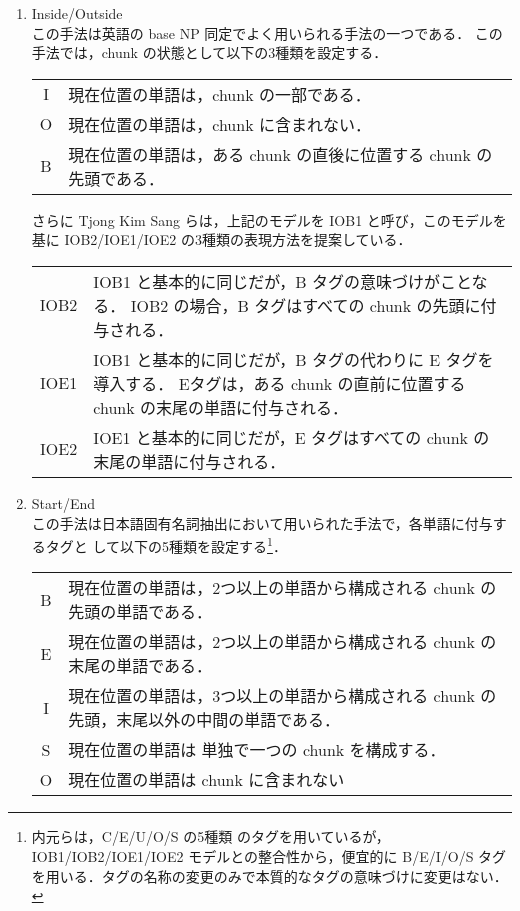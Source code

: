\begin{enumerate}
\item Inside/Outside \\
この手法は英語の base NP 同定でよく用いられる手法の一つである\cite{Ramshaw95}．
この手法では，chunk の状態として以下の3種類を設定する．

\begin{tabular}{cl}
I & 現在位置の単語は，chunk の一部である．\\
O & 現在位置の単語は，chunk に含まれない．\\
B & 現在位置の単語は，ある chunk の直後に位置する chunk の先頭である．\\
\end{tabular}

\vspace*{5mm}
さらに Tjong Kim Sang らは，上記のモデルを IOB1 と呼び，このモデルを基に
IOB2/IOE1/IOE2 の3種類の表現方法を提案している\cite{Tjong_Kim_Sang2000e}．

\begin{tabular}{cp{}}
IOB2 & IOB1 と基本的に同じだが，B タグの意味づけがことなる．
        IOB2 の場合，B タグはすべての chunk の先頭に付与される．\\
IOE1 & IOB1 と基本的に同じだが，B タグの代わりに E タグを導入する．
        Eタグは，ある chunk の直前に位置する chunk の末尾の単語に付与される．\\
IOE2 & IOE1 と基本的に同じだが，E タグはすべての chunk の末尾の単語に付与される．
\end{tabular}

\item Start/End \\
この手法は日本語固有名詞抽出において用いられた手法\cite{内元00}で，各単語に付与するタグと
して以下の5種類を設定する\footnote{内元らは，C/E/U/O/S の5種類
のタグを用いているが，IOB1/IOB2/IOE1/IOE2 モデルとの整合性から，便宜的に
B/E/I/O/S タグを用いる．タグの名称の変更のみで本質的なタグの意味づけに変更はない．}．

\begin{tabular}{cp{}}
B & 現在位置の単語は，2つ以上の単語から構成される chunk の先頭の単語である．\\
E & 現在位置の単語は，2つ以上の単語から構成される chunk の末尾の単語である．\\
I & 現在位置の単語は，3つ以上の単語から構成される chunk の先頭，末尾以外の中間の単語である．\\
S & 現在位置の単語は 単独で一つの chunk を構成する．\\
O & 現在位置の単語は chunk に含まれない\\
\end{tabular}
\end{enumerate}

